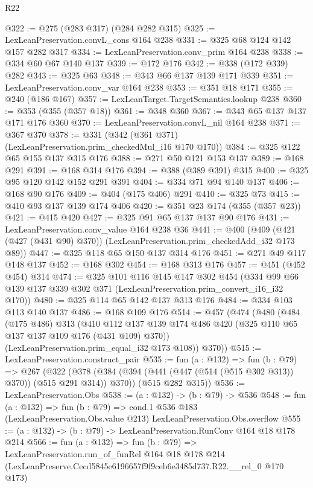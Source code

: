 \begin{lexlean}{R22}
\begin{coremodule}
@322 := @275 (@283 @317) (@284 @282 @315)
@325 := LexLeanPreservation.convL_cons @164 @238
@331 := @325 @68 @124 @142 @157 @282 @317
@334 := LexLeanPreservation.conv_prim @164 @238
@338 := @334 @60 @67 @140 @137
@339 := @172 @176
@342 := @338 (@172 @339) @282
@343 := @325 @63
@348 := @343 @66 @137 @139 @171 @339
@351 := LexLeanPreservation.conv_var @164 @238
@353 := @351 @18 @171
@355 := @240 (@186 @167)
@357 := LexLeanTarget.TargetSemantics.lookup @238
@360 := @353 (@355 (@357 @18))
@361 := @348 @360
@367 := @343 @65 @137 @137 @171 @176 @360
@370 := LexLeanPreservation.convL_nil @164 @238
@371 := @367 @370
@378 := @331 (@342 (@361 @371) (LexLeanPreservation.prim_checkedMul_i16 @170 @170))
@384 := @325 @122 @65 @155 @137 @315 @176
@388 := @271 @50 @121 @153 @137
@389 := @168 @291
@391 := @168 @314 @176
@394 := @388 (@389 @391) @315
@400 := @325 @95 @120 @142 @152 @291 @391
@404 := @334 @71 @94 @140 @137
@406 := @168 @90 @176
@409 := @404 (@175 @406) @291
@410 := @325 @73
@415 := @410 @93 @137 @139 @174 @406
@420 := @351 @23 @174 (@355 (@357 @23))
@421 := @415 @420
@427 := @325 @91 @65 @137 @137 @90 @176
@431 := LexLeanPreservation.conv_value @164 @238 @36
@441 := @400 (@409 (@421 (@427 (@431 @90) @370)) (LexLeanPreservation.prim_checkedAdd_i32 @173 @89))
@447 := @325 @118 @65 @150 @137 @314 @176
@451 := @271 @49 @117 @148 @137
@452 := @168 @302
@454 := @168 @313 @176
@457 := @451 (@452 @454) @314
@474 := @325
    @101
    @116
    @145
    @147
    @302
    @454
    (@334 @99 @66 @139 @137 @339 @302 @371 (LexLeanPreservation.prim_convert_i16_i32 @170))
@480 := @325 @114 @65 @142 @137 @313 @176
@484 := @334 @103 @113 @140 @137
@486 := @168 @109 @176
@514 := @457
    (@474
      (@480
        (@484
          (@175 @486)
          @313
          (@410 @112 @137 @139 @174 @486 @420 (@325 @110 @65 @137 @137 @109 @176 (@431 @109) @370))
          (LexLeanPreservation.prim_equal_i32 @173 @108))
        @370))
@515 := LexLeanPreservation.construct_pair
@535 := fun (a : @132) =>
  fun (b : @79) =>
  @267
    (@322
      (@378 (@384 (@394 (@441 (@447 (@514 (@515 @302 @313)) @370)) (@515 @291 @314)) @370))
      (@515 @282 @315))
@536 := LexLeanPreservation.Obs
@538 := (a : @132) -> (b : @79) -> @536
@548 := fun (a : @132) =>
  fun (b : @79) =>
  cond.{1} @536 @183 (LexLeanPreservation.Obs.value @213) LexLeanPreservation.Obs.overflow
@555 := (a : @132) -> (b : @79) -> LexLeanPreservation.RunConv @164 @18 @178 @214
@566 := fun (a : @132) =>
  fun (b : @79) =>
  LexLeanPreservation.run_of_funRel
    @164
    @18
    @178
    @214
    (LexLeanPreserve.Cecd5845e6196657f9f9ceb6e3485d737.R22.__rel_0 @170 @173)
\end{coremodule}
\end{lexlean}
